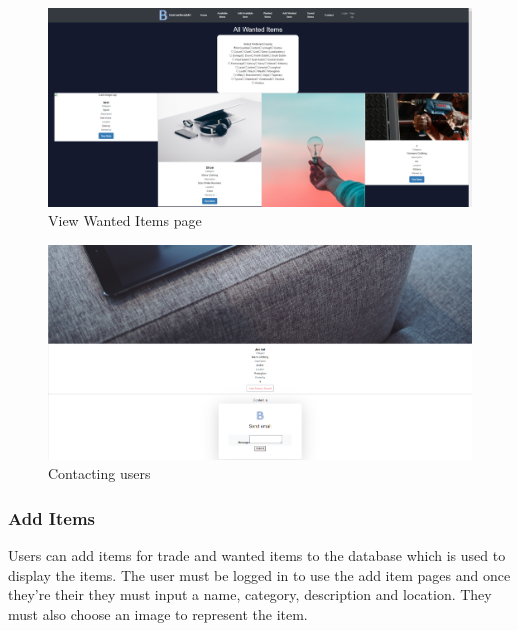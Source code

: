 \begin{figure}[ht]
\renewcommand\thefigure{4.3}
\centering
\includegraphics[width = \textwidth]{img/fe_wanteditems.PNG}
\caption{View Wanted Items page}
\label{WantedItems}
\end{figure}

\begin{figure}[h]
\renewcommand\thefigure{4.4}
\centering
\includegraphics[width = \textwidth]{img/fe_itemcontact.PNG}
\caption{Contacting users}
\label{Contact}
\end{figure}
\newpage

\subsubsection{Add Items}
Users can add items for trade and wanted items to the database which is used to display the items. The user must be logged in to use the add item pages and once they're their they must input a name, category, description and location. They must also choose an image to represent the item.

